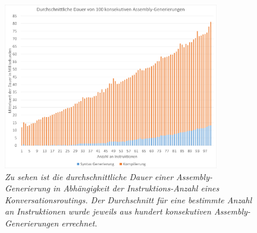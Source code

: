 \begin{figure} %
	\centering
		\includegraphics[width=0.84\textwidth]{img/AverageTimeDiagram.png}
	\caption[Durchschnittliche Dauer von Assembly-Generierungen]{\textit{Zu sehen ist die durchschnittliche Dauer einer Assembly-Generierung in Abhängigkeit der Instruktions-Anzahl eines Konversationsroutings. Der Durchschnitt für eine bestimmte Anzahl an Instruktionen wurde jeweils aus hundert konsekutiven Assembly-Generierungen errechnet.}}
	\label{fig:AverageTimeDiagram}
\end{figure}
